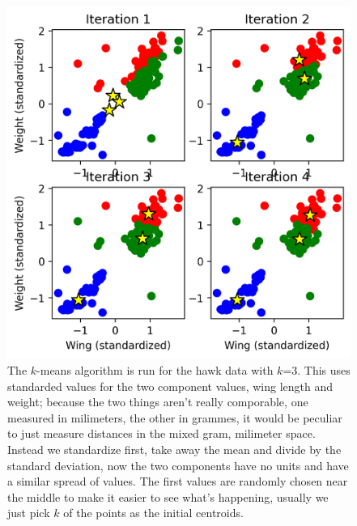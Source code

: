 \documentclass[12pt]{article}
\begin{document}
\begin{figure}[htb]
\begin{center}  
  \includegraphics{04.1_khawks.png}
\end{center}
\caption{The $k$-means algorithm is run for the hawk data with
  $k$=3. This uses standarded values for the two component values,
  wing length and weight; because the two things aren't really
  comporable, one measured in milimeters, the other in grammes, it
  would be peculiar to just measure distances in the mixed gram,
  milimeter space. Instead we standardize first, take away the mean
  and divide by the standard deviation, now the two components have no
  units and have a similar spread of values. The first values are
  randomly chosen near the middle to make it easier to see what's
  happening, usually we just pick $k$ of the points as the initial
  centroids.\label{fig:khawks}}
\end{figure}
\end{document}
